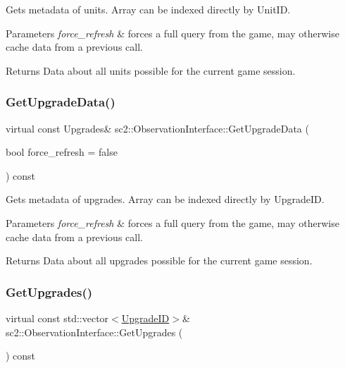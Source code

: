 Gets metadata of units. Array can be indexed directly by Unit\+ID. 
\begin{DoxyParams}{Parameters}
{\em force\+\_\+refresh} & forces a full query from the game, may otherwise cache data from a previous call. \\
\hline
\end{DoxyParams}
\begin{DoxyReturn}{Returns}
Data about all units possible for the current game session. 
\end{DoxyReturn}
\mbox{\label{classsc2_1_1_observation_interface_a10b0d3b3131951ad656cb091aaa2040d}} 
\subsubsection{\texorpdfstring{Get\+Upgrade\+Data()}{GetUpgradeData()}}
{\footnotesize\ttfamily virtual const Upgrades\& sc2\+::\+Observation\+Interface\+::\+Get\+Upgrade\+Data (\begin{DoxyParamCaption}\item[{bool}]{force\+\_\+refresh = {\ttfamily false} }\end{DoxyParamCaption}) const\hspace{0.3cm}{\ttfamily [pure virtual]}}

Gets metadata of upgrades. Array can be indexed directly by Upgrade\+ID. 
\begin{DoxyParams}{Parameters}
{\em force\+\_\+refresh} & forces a full query from the game, may otherwise cache data from a previous call. \\
\hline
\end{DoxyParams}
\begin{DoxyReturn}{Returns}
Data about all upgrades possible for the current game session. 
\end{DoxyReturn}
\mbox{\label{classsc2_1_1_observation_interface_a0a794661f0072921a75d4c5851cfb9e9}} 
\subsubsection{\texorpdfstring{Get\+Upgrades()}{GetUpgrades()}}
{\footnotesize\ttfamily virtual const std\+::vector$<$\hyperlink{classsc2_1_1_s_c2_type}{Upgrade\+ID}$>$\& sc2\+::\+Observation\+Interface\+::\+Get\+Upgrades (\begin{DoxyParamCaption}{ }\end{DoxyParamCaption}) const\hspace{0.3cm}{\ttfamily [pure virtual]}}

